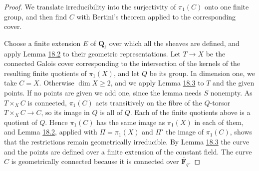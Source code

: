 \documentclass[11pt]{article}
\begin{document}
\begin{proof}[{Proof}]\label{bp15}%
We translate irreducibility into the surjectivity of \(\pi_1(C)\) onto one finite group, and then find \(C\) with Bertini's theorem applied to the corresponding cover.

Choose a finite extension \(E\) of \(\mathbf Q_\ell\) over which all the sheaves are defined, and apply Lemma \hyperref[bp8]{18.2} to their geometric representations. Let \(T\to X\) be the connected Galois cover corresponding to the intersection of the kernels of the resulting finite quotients of \(\pi_1(X)\), and let \(Q\) be its group. In dimension one, we take \(C=X\). Otherwise \(\dim X\ge2\), and we apply Lemma \hyperref[bp11]{18.3} to \(T\) and the given points. If no points are given we add one, since the lemma needs \(S\) nonempty. As \(T\times_XC\) is connected, \(\pi_1(C)\) acts transitively on the fibre of the \(Q\)-torsor \(T\times_XC\to C\), so its image in \(Q\) is all of \(Q\). Each of the finite quotients above is a quotient of \(Q\). Hence \(\pi_1(C)\) has the same image as \(\pi_1(X)\) in each of them, and Lemma \hyperref[bp8]{18.2}, applied with \(\Pi=\pi_1(X)\) and \(\Pi'\) the image of \(\pi_1(C)\), shows that the restrictions remain geometrically irreducible. By Lemma \hyperref[bp11]{18.3} the curve and the points are defined over a finite extension of the constant field. The curve \(C\) is geometrically connected because it is connected over \(\overline{\mathbf F}_q\).
\end{proof}


\end{document}
